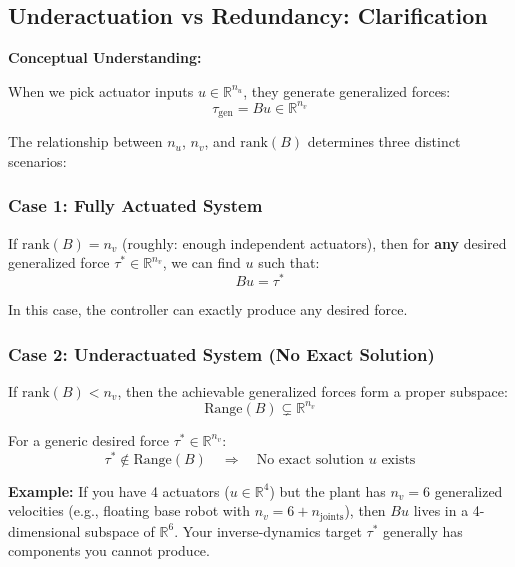 \subsection*{Underactuation vs Redundancy: Clarification}

\textbf{Conceptual Understanding:}

When we pick actuator inputs $u \in \mathbb{R}^{n_u}$, they generate generalized forces:
\begin{equation}
\tau_{\text{gen}} = Bu \in \mathbb{R}^{n_v}
\end{equation}

The relationship between $n_u$, $n_v$, and $\text{rank}(B)$ determines three distinct scenarios:

\subsubsection*{Case 1: Fully Actuated System}

If $\text{rank}(B) = n_v$ (roughly: enough independent actuators), then for \textbf{any} desired generalized force $\tau^* \in \mathbb{R}^{n_v}$, we can find $u$ such that:
\begin{equation}
Bu = \tau^*
\end{equation}

In this case, the controller can exactly produce any desired force.

\subsubsection*{Case 2: Underactuated System (No Exact Solution)}

If $\text{rank}(B) < n_v$, then the achievable generalized forces form a proper subspace:
\begin{equation}
\text{Range}(B) \subsetneq \mathbb{R}^{n_v}
\end{equation}

For a generic desired force $\tau^* \in \mathbb{R}^{n_v}$:
\begin{equation}
\tau^* \notin \text{Range}(B) \quad \Rightarrow \quad \text{No exact solution } u \text{ exists}
\end{equation}

\textbf{Example:} If you have 4 actuators ($u \in \mathbb{R}^4$) but the plant has $n_v = 6$ generalized velocities (e.g., floating base robot with $n_v = 6 + n_{\text{joints}}$), then $Bu$ lives in a 4-dimensional subspace of $\mathbb{R}^6$. Your inverse-dynamics target $\tau^*$ generally has components you cannot produce.

